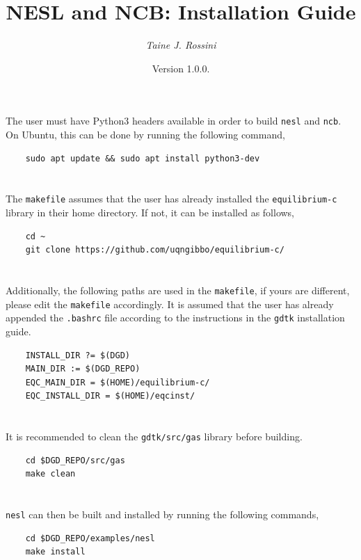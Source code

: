 \documentclass[10pt,a4paper]{article}
\title{NESL and NCB: Installation Guide}
\author{\textit{Taine J. Rossini}}
\date{Version 1.0.0.}
\begin{document}
\maketitle

\section{}

The user must have Python3 headers available in order to build \texttt{nesl} and \texttt{ncb}. On Ubuntu, this can be done by running the following command,

\begin{verbatim}
    sudo apt update && sudo apt install python3-dev
\end{verbatim}

\section{}

The \texttt{makefile} assumes that the user has already installed the \texttt{equilibrium-c} library in their home directory. If not, it can be installed as follows,

\begin{verbatim}
    cd ~
    git clone https://github.com/uqngibbo/equilibrium-c/
\end{verbatim}

\section{}

Additionally, the following paths are used in the \texttt{makefile}, if yours are different, please edit the \texttt{makefile} accordingly. It is assumed that the user has already appended the \texttt{.bashrc} file according to the instructions in the \texttt{gdtk} installation guide.

\begin{verbatim}
    INSTALL_DIR ?= $(DGD)
    MAIN_DIR := $(DGD_REPO)
    EQC_MAIN_DIR = $(HOME)/equilibrium-c/
    EQC_INSTALL_DIR = $(HOME)/eqcinst/
\end{verbatim}

\section{}

It is recommended to clean the \texttt{gdtk/src/gas} library before building.

\begin{verbatim}
    cd $DGD_REPO/src/gas
    make clean
\end{verbatim}

\section{}

\texttt{nesl} can then be built and installed by running the following commands,

\begin{verbatim}
    cd $DGD_REPO/examples/nesl
    make install
\end{verbatim}
\end{document}
